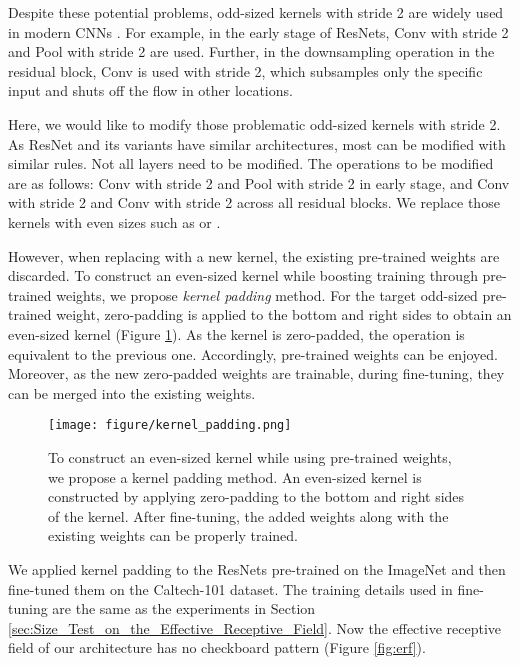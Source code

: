 \documentclass[letterpaper]{article} \usepackage{aaai22}  \usepackage{times}  \usepackage{helvet}  \usepackage{courier}  \usepackage[hyphens]{url}  \usepackage{graphicx} \urlstyle{rm} \def\UrlFont{\rm}  \usepackage{natbib}  \usepackage{caption} \DeclareCaptionStyle{ruled}{labelfont=normalfont,labelsep=colon,strut=off} \frenchspacing  \setlength{\pdfpagewidth}{8.5in}  \setlength{\pdfpageheight}{11in}  \usepackage{algorithm}
\begin{document}
Despite these potential problems, odd-sized kernels with stride 2 are widely used in modern CNNs \cite{huang2017densely,szegedy2015going,iandola2016squeezenet,krizhevsky2012imagenet,ma2018shufflenet,sandler2018mobilenetv2}. For example, in the early stage of ResNets,  Conv with stride 2 and  Pool with stride 2 are used. Further, in the downsampling operation in the residual block,  Conv is used with stride 2, which subsamples only the specific input and shuts off the flow in other locations.

Here, we would like to modify those problematic odd-sized kernels with stride 2. As ResNet and its variants have similar architectures, most can be modified with similar rules. Not all layers need to be modified. The operations to be modified are as follows:  Conv with stride 2 and  Pool with stride 2 in early stage, and  Conv with stride 2 and  Conv with stride 2 across all residual blocks. We replace those kernels with even sizes such as  or .

However, when replacing with a new kernel, the existing pre-trained weights are discarded. To construct an even-sized kernel while boosting training through pre-trained weights, we propose \textit{kernel padding} method. For the target odd-sized pre-trained weight, zero-padding is applied to the bottom and right sides to obtain an even-sized kernel (Figure \ref{fig:kp}). As the kernel is zero-padded, the operation is equivalent to the previous one. Accordingly, pre-trained weights can be enjoyed. Moreover, as the new zero-padded weights are trainable, during fine-tuning, they can be merged into the existing weights.

\begin{figure}[t!]
	\centering
	\texttt{[image: figure/kernel\_padding.png]}
	\caption{To construct an even-sized kernel while using pre-trained weights, we propose a kernel padding method. An even-sized kernel is constructed by applying zero-padding to the bottom and right sides of the kernel. After fine-tuning, the added weights along with the existing weights can be properly trained.}
	\label{fig:kp}
\end{figure}

We applied kernel padding to the ResNets pre-trained on the ImageNet and then fine-tuned them on the Caltech-101 dataset. The training details used in fine-tuning are the same as the experiments in Section \ref{sec:Size_Test_on_the_Effective_Receptive_Field}. Now the effective receptive field of our architecture has no checkboard pattern (Figure \ref{fig:erf}).
\end{document}

